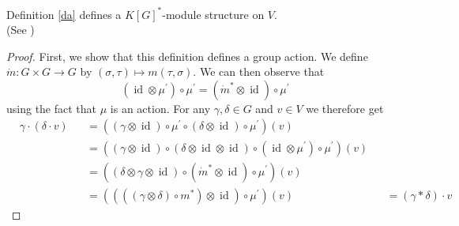 \begin{proposition}\label{do}
  Definition \ref{da} defines a $K[G]^\ast$-module structure on $V$.\\
  (See \cite[A2.10]{DK15})
\end{proposition}

\begin{proof}
  First, we show that this definition defines a group action.
  We define $\dot{m} \colon G \times G \rightarrow G$ by $(\sigma,\tau) \mapsto m(\tau,\sigma)$.
  We can then observe that
  \begin{equation}
    (\operatorname{id} \otimes \mu^\prime)\circ\mu^\prime = (\dot{m}^\ast \otimes \operatorname{id}) \circ \mu^\prime
  \end{equation}
  using the fact that $\mu$ is an action.
  For any $\gamma,\delta \in G$ and $v \in V$ we therefore get
  \begin{equation}
    \begin{aligned}
      & \gamma \cdot (\delta \cdot v)
      &&= ((\gamma \otimes \operatorname{id})\circ\mu^\prime\circ(\delta \otimes \operatorname{id})\circ\mu^\prime)(v)\\
      &&&= ((\gamma \otimes \operatorname{id})\circ(\delta \otimes \operatorname{id}\otimes\operatorname{id})\circ(\operatorname{id}\otimes\mu^\prime)\circ\mu^\prime)(v)\\
      &&&= ((\delta\otimes\gamma\otimes\operatorname{id})\circ(\dot{m}^\ast\otimes\operatorname{id})\circ\mu^\prime)(v)\\
      &&&= ((((\gamma\otimes\delta)\circ m^\ast)\otimes\operatorname{id})\circ\mu^\prime)(v)
      &&= (\gamma \ast \delta) \cdot v
    \end{aligned}
  \end{equation}
  

\end{proof}
